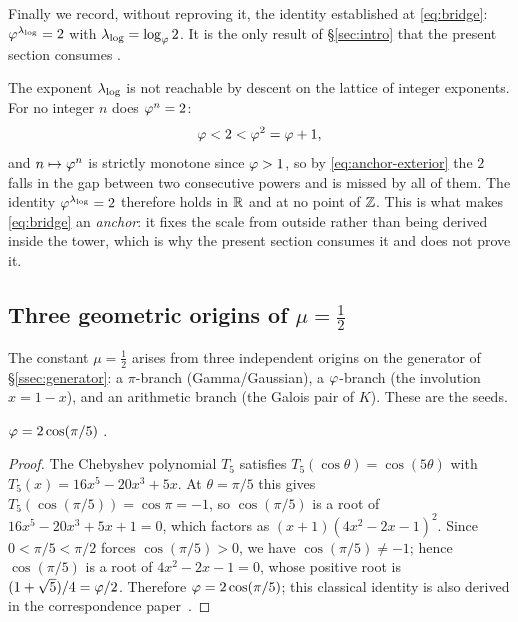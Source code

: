 Finally we record, without reproving it, the identity established at \eqref{eq:bridge}:
$\varphi^{\lambda_{\log}}=2$ with $\lambda_{\log}=\log_{\varphi}2$. It is the only result of \S\ref{sec:intro} that
the present section consumes .

\begin{proposition}\label{prop:anchor-exterior}
The exponent $\lambda_{\log}$ is not reachable by descent on the lattice of integer exponents. For no integer
$n$ does $\varphi^{n}=2$:
\begin{equation}\label{eq:anchor-exterior}
  \varphi<2<\varphi^{2}=\varphi+1,
\end{equation}
and $n\mapsto\varphi^{n}$ is strictly monotone since $\varphi>1$, so by \eqref{eq:anchor-exterior}
the $2$ falls in the gap between two consecutive powers and is missed by all of them. The identity
$\varphi^{\lambda_{\log}}=2$ therefore holds in $\mathbb{R}$ and at no point of $\mathbb{Z}$. This is what makes
\eqref{eq:bridge} an \emph{anchor}: it fixes the scale from outside rather than being derived
inside the tower, which is why the present section consumes it and does not prove it.

\end{proposition}

\subsection{Three geometric origins of $\mu=\tfrac12$}\label{ssec:origins}

The constant $\mu=\tfrac12$ arises from three independent origins on the generator of
\S\ref{ssec:generator}: a $\pi$-branch (Gamma/Gaussian), a $\varphi$-branch (the involution
$x=1-x$), and an arithmetic branch (the Galois pair of $K$). These are the seeds.

\begin{theorem}\label{thm:pentagon-id}
$\varphi=2\cos(\pi/5)$ .
\end{theorem}
\medskip
\begin{proof}
The Chebyshev polynomial $T_5$ satisfies $T_5(\cos\theta)=\cos(5\theta)$ with
$T_5(x)=16x^5-20x^3+5x$. At $\theta=\pi/5$ this gives
$T_5(\cos(\pi/5))=\cos\pi=-1$, so $\cos(\pi/5)$ is a root of
$16x^5-20x^3+5x+1=0$, which factors as $(x+1)(4x^2-2x-1)^2$. Since
$0<\pi/5<\pi/2$ forces $\cos(\pi/5)>0$, we have $\cos(\pi/5)\neq-1$; hence
$\cos(\pi/5)$ is a root of $4x^2-2x-1=0$, whose positive root is
$(1+\sqrt5)/4=\varphi/2$. Therefore $\varphi=2\cos(\pi/5)$; this classical identity is also
derived in the correspondence paper~\cite{Corr}.
\end{proof}

